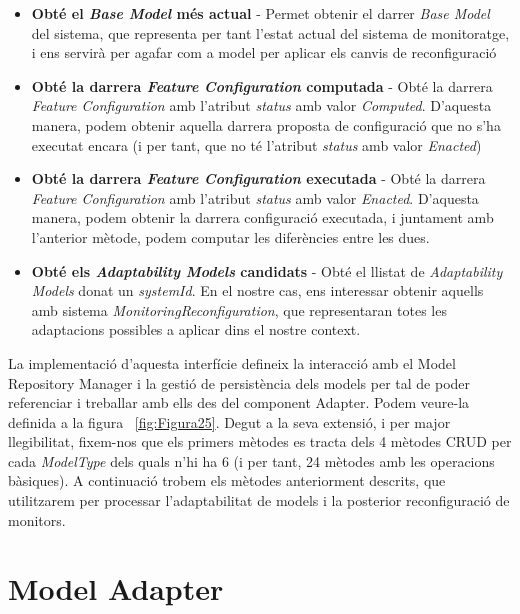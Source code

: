 \begin{itemize}
\item \textbf{Obté el \textit{Base Model} més actual} - Permet obtenir el darrer \textit{Base Model} del sistema, que representa per tant l'estat actual del sistema de monitoratge, i ens servirà per agafar com a model per aplicar els canvis de reconfiguració
\item \textbf{Obté la darrera \textit{Feature Configuration} computada} - Obté la darrera \textit{Feature Configuration} amb l'atribut \textit{status} amb valor \textit{Computed}. D'aquesta manera, podem obtenir aquella darrera proposta de configuració que no s'ha executat encara (i per tant, que no té l'atribut \textit{status} amb valor \textit{Enacted})
\item \textbf{Obté la darrera \textit{Feature Configuration} executada} - Obté la darrera \textit{Feature Configuration} amb l'atribut \textit{status} amb valor \textit{Enacted}. D'aquesta manera, podem obtenir la darrera configuració executada, i juntament amb l'anterior mètode, podem computar les diferències entre les dues.
\item \textbf{Obté els \textit{Adaptability Models} candidats} - Obté el llistat de \textit{Adaptability Models} donat un \textit{systemId}. En el nostre cas, ens interessar obtenir aquells amb sistema \textit{MonitoringReconfiguration}, que representaran totes les adaptacions possibles a aplicar dins el nostre context.
\end{itemize}

La implementació d'aquesta interfície defineix la interacció amb el Model Repository Manager i la gestió de persistència dels models per tal de poder referenciar i treballar amb ells des del component Adapter. Podem veure-la definida a la figura ~\ref{fig:Figura25}. Degut a la seva extensió, i per major llegibilitat, fixem-nos que els primers mètodes es tracta dels 4 mètodes CRUD per cada \textit{ModelType} dels quals n'hi ha 6 (i per tant, 24 mètodes amb les operacions bàsiques). A continuació trobem els mètodes anteriorment descrits, que utilitzarem per processar l'adaptabilitat de models i la posterior reconfiguració de monitors.

\section{Model Adapter}

